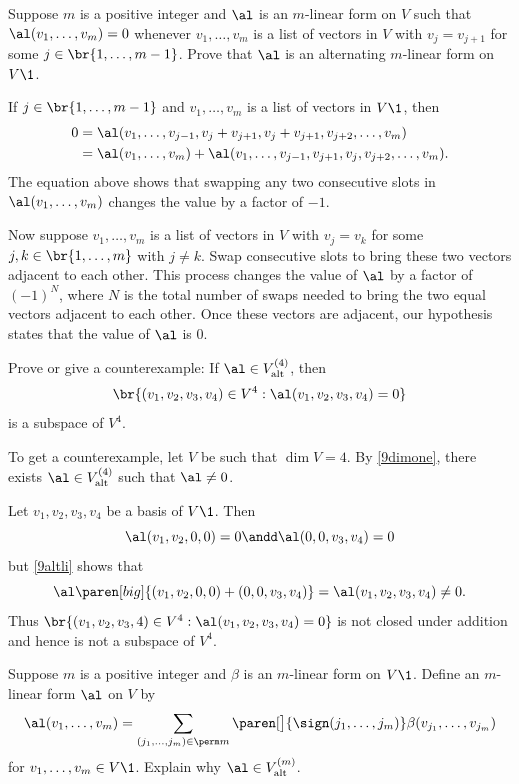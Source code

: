 \exercise
Suppose $m$ is a positive integer and $\al$ is an $m$-linear form on $V$ such that $\al(v_1, \ldots, v_m) = 0$ whenever
$v_1, \ldots, v_m$ is a list of vectors in $V$ with $v_j = v_{j+1}$ for some $j \in \br{1, \ldots, m-1}$. Prove that $\al$ is an alternating $m$-linear form on~$V\1$.

\begin{Solution}
If $j \in \br{1, \ldots, m-1}$ and $v_1, \ldots, v_m$ is a list of vectors in $V\1$, then
\begin{align*}
0 &= \al( v_1, \ldots, v_{j-1}, v_j + v_{j+1}, v_j + v_{j+1}, v_{j+2}, \ldots, v_m) \\
&= \al( v_1, \ldots, v_m) + \al( v_1, \ldots, v_{j-1}, v_{j+1}, v_j, v_{j+2}, \ldots, v_m).
\end{align*}
The equation above shows that swapping any two consecutive slots in $\al( v_1, \ldots, v_m)$ changes the value by a factor of $-1$.

Now suppose $v_1, \ldots, v_m$ is a list of vectors in $V$ with $v_j = v_k$ for some $j, k \in \br{1, \ldots, m}$ with $j \ne k$. Swap consecutive slots to bring these two vectors adjacent to each other. This process changes the value of $\al$ by a factor of $(-1)^N$, where $N$ is the total number of swaps needed to bring the two equal vectors adjacent to each other. Once these vectors are adjacent, our hypothesis states that the value of $\al$ is $0$.
\end{Solution}

\exercise
Prove or give a counterexample: If $\al \in V^{(4)}_\text{alt}$, then
\[
\br{ (v_1, v_2, v_3, v_4) \in V^4 : \al(v_1, v_2, v_3, v_4) = 0 }
\]
is a subspace of $V^4\!$.

\begin{Solution}
To get a counterexample, let $V$ be such that $\dim V = 4$. By \ref{9dimone}, there exists $\al \in V^{(4)}_\text{alt}$ such that $\al \ne 0$.

Let $v_1, v_2, v_3, v_4$ be a basis of $V\1$. Then
\[
\al(v_1, v_2, 0, 0) = 0 \andd \al(0, 0, v_3, v_4) = 0
\]
but \ref{9altli} shows that
\[
\al\paren[big]{ (v_1, v_2, 0, 0) + (0, 0, v_3, v_4) } = \al(v_1, v_2, v_3, v_4) \ne 0.
\]
Thus $\br{ (v_1, v_2, v_3, 4) \in V^4 : \al(v_1, v_2, v_3, v_4) = 0 }$ is not closed under addition and hence is not a subspace of $V^4\!$.
\end{Solution}

\exercise
Suppose $m$ is a positive integer and $\beta$ is an $m$-linear form on $V\1$. Define an $m$-linear form $\al$ on $V$ by
\[
\al(v_1, \ldots, v_m) =
\sum_{(j_1, \ldots, j_m) \in \perm m} \paren[\bigl]{ \sign(j_1, \ldots, j_m) } \beta( v_{j_1}, \ldots, v_{j_m} )
\]
for $v_1, \ldots, v_m \in V\1$. Explain why $\al \in V^{(m)}_{\text{alt}}$.

